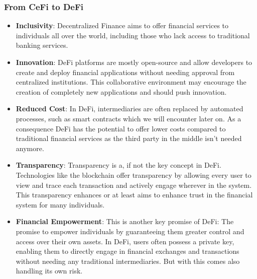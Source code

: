 \documentclass{article}
\begin{document}
\subsubsection{From CeFi to DeFi}

\begin{itemize}
    \item \textbf{Inclusivity}: Decentralized Finance aims to offer financial services to individuals all over the world, including those who lack access to traditional banking services.
    \item \textbf{Innovation}: DeFi platforms are mostly open-source and allow developers to create and deploy financial applications without needing approval from centralized institutions. This collaborative environment may encourage the creation of completely new applications and should push innovation.
    \item \textbf{Reduced Cost}: In DeFi, intermediaries are often replaced by automated processes, such as smart contracts which we will encounter later on. As a consequence DeFi has the potential to offer lower costs compared to traditional financial services as the third party in the middle isn't needed anymore.
    \item \textbf{Transparency}: Transparency is a, if not the key concept in DeFi. Technologies like the blockchain offer transparency by allowing every user to view and trace each transaction and actively engage wherever in the system. This transparency enhances or at least aims to enhance trust in the financial system for many individuals.
    \item \textbf{Financial Empowerment}: This is another key promise of DeFi: The promise to empower individuals by guaranteeing them greater control and access over their own assets. In DeFi, users often possess a private key, enabling them to directly engage in financial exchanges and transactions without needing any traditional intermediaries. But with this comes also handling its own risk.
\end{itemize}
\end{document}
